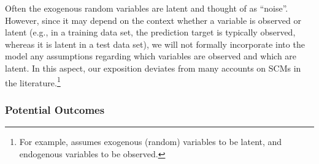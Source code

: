 \begin{Rem}
Often the exogenous random variables are latent and thought of as ``noise''.
However, since it may depend on the context whether a variable is observed or latent 
(e.g., in a training data set, the prediction target is typically observed, whereas
it is latent in a test data set), we will not formally incorporate into the model 
any assumptions regarding which variables are observed and which are latent. 
In this aspect, our exposition deviates from many accounts on SCMs in the literature.\footnote{For 
example, \cite{Pearl09} assumes exogenous (random) variables to be latent, and
endogenous variables to be observed.}
\end{Rem}

\subsubsection{Potential Outcomes}

